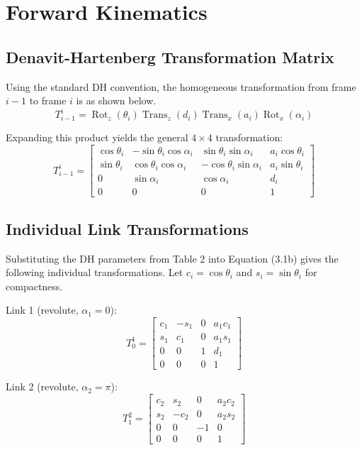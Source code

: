 \documentclass{article}
\begin{document}
\section{Forward Kinematics}

\subsection{Denavit-Hartenberg Transformation Matrix}
Using the standard DH convention, the homogeneous transformation from frame $i-1$ to frame $i$ is as shown below.
\begin{equation}
T_{i-1}^{i} = \operatorname{Rot}_z(\theta_i) \operatorname{Trans}_z(d_i) \operatorname{Trans}_x(a_i) \operatorname{Rot}_x(\alpha_i) \tag{3.1a}
\end{equation}

Expanding this product yields the general $4 \times 4$ transformation:
\begin{equation*}
T_{i-1}^{i} = \begin{bmatrix} 
\cos\theta_i & -\sin\theta_i \cos\alpha_i & \sin\theta_i \sin\alpha_i & a_i \cos\theta_i \\ 
\sin\theta_i & \cos\theta_i \cos\alpha_i & -\cos\theta_i \sin\alpha_i & a_i \sin\theta_i \\ 
0 & \sin\alpha_i & \cos\alpha_i & d_i \\ 
0 & 0 & 0 & 1 
\end{bmatrix} \tag{3.1b}
\end{equation*}

\subsection{Individual Link Transformations}
Substituting the DH parameters from Table 2 into Equation (3.1b) gives the following individual transformations. Let $c_i = \cos\theta_i$ and $s_i = \sin\theta_i$ for compactness.

Link 1 (revolute, $\alpha_1 = 0$):
\begin{equation}
T_0^1 = \begin{bmatrix} c_1 & -s_1 & 0 & a_1 c_1 \\ s_1 & c_1 & 0 & a_1 s_1 \\ 0 & 0 & 1 & d_1 \\ 0 & 0 & 0 & 1 \end{bmatrix} \tag{3.2}
\end{equation}

Link 2 (revolute, $\alpha_2 = \pi$):
\begin{equation}
T_1^2 = \begin{bmatrix} c_2 & s_2 & 0 & a_2 c_2 \\ s_2 & -c_2 & 0 & a_2 s_2 \\ 0 & 0 & -1 & 0 \\ 0 & 0 & 0 & 1 \end{bmatrix} \tag{3.3}
\end{equation}
\end{document}
